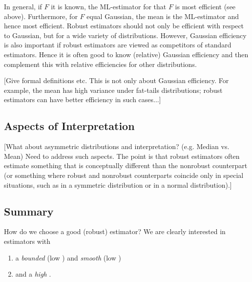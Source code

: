 In general, if $F$ it is known, the ML-estimator for that $F$ is most efficient
(see above). Furthermore, for $F$ equal Gaussian, the mean is the ML-estimator
and hence most efficient. Robust estimators should not only be efficient with
respect to Gaussian, but for a wide variety of distributions. However, Gaussian
efficiency is also important if robust estimators are viewed as competitors of
standard estimators. Hence it is often good to know (relative) Gaussian
efficiency and then complement this with relative efficiencies for other
distributions.

\alert{[Give formal definitions etc. This is not only about Gaussian
efficiency. For example, the mean has high variance under fat-tails
distributions; robust estimators can have better efficiency in such cases...]}


\subsection{Aspects of Interpretation}

\alert{[What about asymmetric distributions and interpretation? (e.g.
Median vs. Mean) Need to address such aspects. The point is that robust
estimators often estimate something that is conceptually different than the
nonrobust counterpart (or something where robust and nonrobust counterparts
coincide only in special situations, such as in a symmetric distribution or in
a normal distribution).]}

\subsection{Summary}

How do we choose a good (robust) estimator? We are clearly interested in estimators with

\begin{enumerate}
    \item a \emph{bounded} (low )
    and \emph{smooth} (low ) \emph{} 

    \item and a \emph{high }.
\end{enumerate}

